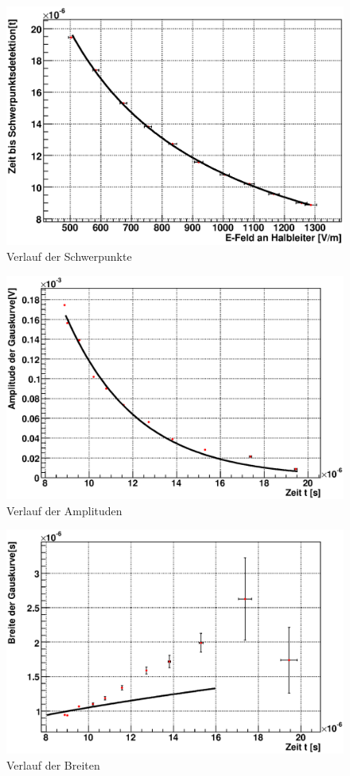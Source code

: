 \documentclass[12pt]{article}
\begin{document}
\begin{figure}[H]  
\includegraphics[width=0.9\linewidth]{pictures/varVolt/movabilty.eps}
\caption{Verlauf der Schwerpunkte}
\end{figure}

\begin{figure}[H]  
\includegraphics[width=0.9\linewidth]{pictures/varVolt/lifetime.eps}
\caption{Verlauf der Amplituden}
\end{figure}

\begin{figure}[H]  
\includegraphics[width=0.9\linewidth]{pictures/varVolt/diffusion.eps}
\caption{Verlauf der Breiten}
\end{figure}
\newpage
\end{document}
